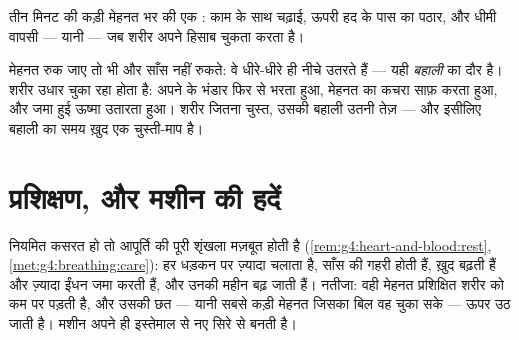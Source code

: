 \begin{omfigure}

{\small तीन मिनट की कड़ी मेहनत भर की एक : काम के साथ चढ़ाई, ऊपरी हद
के पास का पठार, और धीमी वापसी --- यानी  --- जब शरीर अपने हिसाब
चुकता करता है।}
\end{omfigure}

\begin{definition}[बहाली]\label{def:g7:organs-at-work:recovery}
मेहनत रुक जाए तो भी  और साँस नहीं रुकते: वे धीरे-धीरे ही नीचे
उतरते हैं --- यही \emph{बहाली} का दौर है। शरीर उधार चुका
रहा होता है: अपने  के भंडार फिर से भरता हुआ, मेहनत का कचरा साफ़
करता हुआ, और जमा हुई ऊष्मा उतारता हुआ। शरीर जितना चुस्त, उसकी बहाली उतनी
तेज़ --- और इसीलिए बहाली का समय ख़ुद एक चुस्ती-माप है।
\end{definition}

\section{प्रशिक्षण, और मशीन की हदें}

\begin{proposition}[प्रशिक्षण छत ऊपर उठाता है]\label{prop:g7:organs-at-work:training}
नियमित कसरत हो तो आपूर्ति की पूरी शृंखला मज़बूत होती है
(\cref{rem:g4:heart-and-blood:rest}, \cref{met:g4:breathing:care}):
 हर धड़कन पर ज़्यादा  चलाता है, साँस की  गहरी होती हैं,
 ख़ुद बढ़ती हैं और ज़्यादा ईंधन जमा करती हैं, और उनकी महीन
 बढ़ जाती हैं। नतीजा: वही मेहनत प्रशिक्षित शरीर को कम  पर
पड़ती है, और उसकी छत --- यानी सबसे कड़ी मेहनत जिसका बिल वह चुका सके ---
ऊपर उठ जाती है। मशीन अपने ही इस्तेमाल से नए सिरे से बनती है।
\end{proposition}
\admitted

